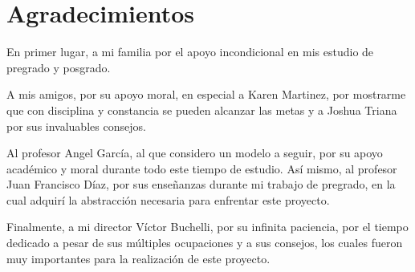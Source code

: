 \section*{Agradecimientos}

En primer lugar, a mi familia por el apoyo incondicional en mis estudio de pregrado y posgrado.

A mis amigos, por su apoyo moral, en especial a Karen Martinez, por mostrarme que con disciplina y constancia se pueden alcanzar las metas y a Joshua Triana por sus invaluables consejos.

Al profesor Angel García, al que considero un modelo a seguir, por su apoyo académico y moral durante todo este tiempo de estudio. Así mismo, al profesor Juan Francisco Díaz, por sus enseñanzas durante mi trabajo de pregrado, en la cual adquirí la abstracción necesaria para enfrentar este proyecto.

Finalmente, a mi director Víctor Buchelli, por su infinita paciencia, por el tiempo dedicado a pesar de sus múltiples ocupaciones y a sus consejos, los cuales fueron muy importantes para la realización de este proyecto.